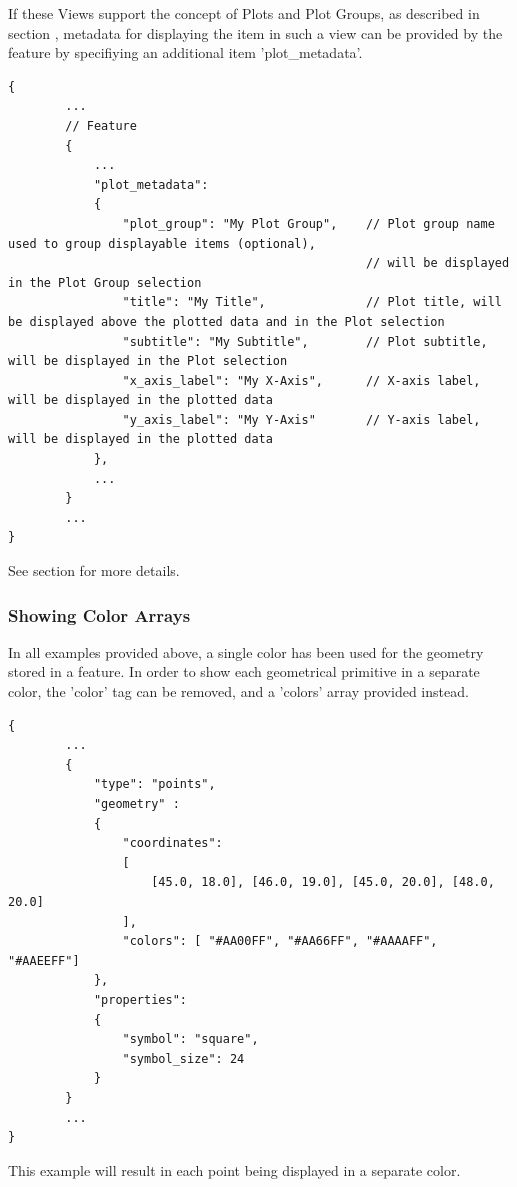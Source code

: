 If these Views support the concept of Plots and Plot Groups, as described in section ,
metadata for displaying the item in such a view can be provided by the feature by specifiying an additional item 'plot\_metadata'.

\begin{lstlisting}[basicstyle=\small\ttfamily]
{
        ...
        // Feature 
        {
            ...
            "plot_metadata": 
            {
                "plot_group": "My Plot Group",    // Plot group name used to group displayable items (optional), 
                                                  // will be displayed in the Plot Group selection
                "title": "My Title",              // Plot title, will be displayed above the plotted data and in the Plot selection
                "subtitle": "My Subtitle",        // Plot subtitle, will be displayed in the Plot selection
                "x_axis_label": "My X-Axis",      // X-axis label, will be displayed in the plotted data
                "y_axis_label": "My Y-Axis"       // Y-axis label, will be displayed in the plotted data
            },
            ...
        }
        ...
}
\end{lstlisting}

See section  for more details.

\subsubsection{Showing Color Arrays} In all examples provided above, a single color has been used for the geometry stored in a feature.
In order to show each geometrical primitive in a separate color, the 'color' tag can be removed, and a 'colors' array provided instead.

\begin{lstlisting}[basicstyle=\small\ttfamily]
{
        ...
        {
            "type": "points",
            "geometry" :
            {
                "coordinates": 
                [
                    [45.0, 18.0], [46.0, 19.0], [45.0, 20.0], [48.0, 20.0]
                ],
                "colors": [ "#AA00FF", "#AA66FF", "#AAAAFF", "#AAEEFF"]
            },
            "properties":
            {
                "symbol": "square",
                "symbol_size": 24
            }
        }
        ...
}
\end{lstlisting}

This example will result in each point being displayed in a separate color.


